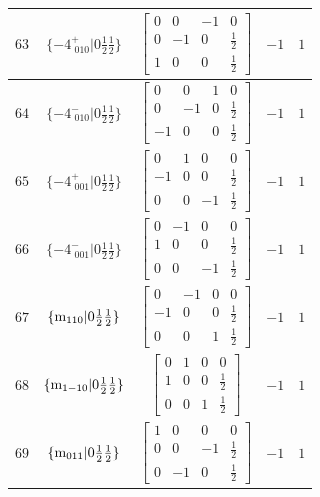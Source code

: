 \documentclass[fleqn,8pt]{jsarticle}
\begin{document}
\begin{longtable}{ccccc}
$ 63 $ & $ \{-4^{+}_{\,\,010}|0 \frac{1}{2} \frac{1}{2}\} $ & $ \begin{bmatrix} 0 & 0 & -1 & 0 \\ 0 & -1 & 0 & \frac{1}{2} \\ 1 & 0 & 0 & \frac{1}{2} \end{bmatrix} $ & $ -1 $ & $ 1 $ \\ \hline
$ 64 $ & $ \{-4^{-}_{\,\,010}|0 \frac{1}{2} \frac{1}{2}\} $ & $ \begin{bmatrix} 0 & 0 & 1 & 0 \\ 0 & -1 & 0 & \frac{1}{2} \\ -1 & 0 & 0 & \frac{1}{2} \end{bmatrix} $ & $ -1 $ & $ 1 $ \\ \hline
$ 65 $ & $ \{-4^{+}_{\,\,001}|0 \frac{1}{2} \frac{1}{2}\} $ & $ \begin{bmatrix} 0 & 1 & 0 & 0 \\ -1 & 0 & 0 & \frac{1}{2} \\ 0 & 0 & -1 & \frac{1}{2} \end{bmatrix} $ & $ -1 $ & $ 1 $ \\ \hline
$ 66 $ & $ \{-4^{-}_{\,\,001}|0 \frac{1}{2} \frac{1}{2}\} $ & $ \begin{bmatrix} 0 & -1 & 0 & 0 \\ 1 & 0 & 0 & \frac{1}{2} \\ 0 & 0 & -1 & \frac{1}{2} \end{bmatrix} $ & $ -1 $ & $ 1 $ \\ \hline
$ 67 $ & $ \{{\rm m}_{110}|0 \frac{1}{2} \frac{1}{2}\} $ & $ \begin{bmatrix} 0 & -1 & 0 & 0 \\ -1 & 0 & 0 & \frac{1}{2} \\ 0 & 0 & 1 & \frac{1}{2} \end{bmatrix} $ & $ -1 $ & $ 1 $ \\ \hline
$ 68 $ & $ \{{\rm m}_{1-10}|0 \frac{1}{2} \frac{1}{2}\} $ & $ \begin{bmatrix} 0 & 1 & 0 & 0 \\ 1 & 0 & 0 & \frac{1}{2} \\ 0 & 0 & 1 & \frac{1}{2} \end{bmatrix} $ & $ -1 $ & $ 1 $ \\ \hline
$ 69 $ & $ \{{\rm m}_{011}|0 \frac{1}{2} \frac{1}{2}\} $ & $ \begin{bmatrix} 1 & 0 & 0 & 0 \\ 0 & 0 & -1 & \frac{1}{2} \\ 0 & -1 & 0 & \frac{1}{2} \end{bmatrix} $ & $ -1 $ & $ 1 $ \\ \hline

\end{longtable}
\end{document}
